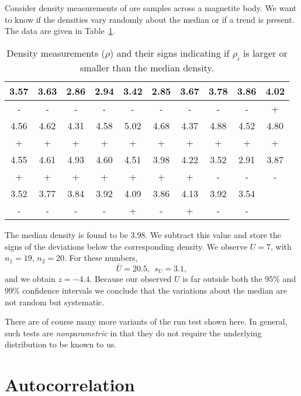 \begin{example}
Consider density measurements of ore samples across a magnetite body.  We 
want to know if the densities vary randomly about the median or if a trend is present.  The data 
are given in Table~\ref{tbl:runtest}.
\begin{table}[h]
\center
\begin{tabular}{|c|c|c|c|c|c|c|c|c|c|} \hline
3.57 & 3.63 & 2.86 & 2.94 & 3.42 & 2.85 & 3.67 & 3.78 & 3.86 & 4.02 \\ \hline
 -   &  -   &  -   &  -   &  -   &  -   &  -   &  -   &  -   &  +   \\ \hline
4.56 & 4.62 & 4.31 & 4.58 & 5.02 & 4.68 & 4.37 & 4.88 & 4.52 & 4.80 \\ \hline
 +   &  +   &  +   &  +   &  +   &  +   &  +   &  +   &  +   &  +   \\ \hline
4.55 & 4.61 & 4.93 & 4.60 & 4.51 & 3.98 & 4.22 & 3.52 & 2.91 & 3.87 \\ \hline
 +   &  +   &  +   &  +   &  +   &  +   &  +   &  -   &  -   &  -   \\ \hline
3.52 & 3.77 & 3.84 & 3.92 & 4.09 & 3.86 & 4.13 & 3.92 & 3.54 &      \\ \hline
 -   &  -   &  -   &  -   &  +   &  -   &  +   &  -   &  -   &      \\ \hline
\end{tabular}
\caption{Density measurements ($\rho$) and their signs indicating if $\rho_i$ is larger or smaller than the median density.}
\label{tbl:runtest}
\end{table}
The median density is found to be 3.98.  We subtract this value and store the signs of the 
deviations below the corresponding density.  We observe $U = 7$, with $n_1 = 19$, $n_2 = 20$.  For these numbers, 
\begin{equation}
\bar{U} = 20.5, \ \ s_U = 3.1,
\end{equation}
and we obtain $z = -4.4$.  Because our observed $U$ is far outside both the 95\% and 99\% confidence intervals we conclude 
that the variations about the median are not random but systematic.
\end{example}
There are of course many 
more variants of the run test shown here.  In general, such tests are \emph{nonparametric} in that they 
do not require the underlying distribution to be known to us.

\section{Autocorrelation}

